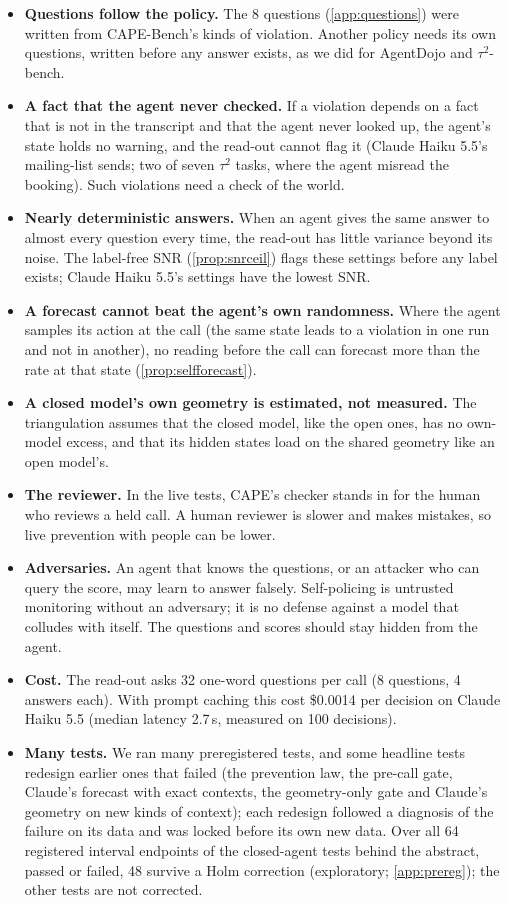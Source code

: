 \begin{itemize}
\item \textbf{Questions follow the policy.} The 8 questions (\cref{app:questions}) were written from CAPE-Bench's kinds of violation. Another policy needs its own questions, written before any answer exists, as we did for AgentDojo and $\tau^2$-bench.
\item \textbf{A fact that the agent never checked.} If a violation depends on a fact that is not in the transcript and that the agent never looked up, the agent's state holds no warning, and the read-out cannot flag it (Claude Haiku 5.5's mailing-list sends; two of seven $\tau^2$ tasks, where the agent misread the booking). Such violations need a check of the world.
\item \textbf{Nearly deterministic answers.} When an agent gives the same answer to almost every question every time, the read-out has little variance beyond its noise. The label-free SNR (\cref{prop:snrceil}) flags these settings before any label exists; Claude Haiku 5.5's settings have the lowest SNR.
\item \textbf{A forecast cannot beat the agent's own randomness.} Where the agent samples its action at the call (the same state leads to a violation in one run and not in another), no reading before the call can forecast more than the rate at that state (\cref{prop:selfforecast}).
\item \textbf{A closed model's own geometry is estimated, not measured.} The triangulation assumes that the closed model, like the open ones, has no own-model excess, and that its hidden states load on the shared geometry like an open model's.
\item \textbf{The reviewer.} In the live tests, CAPE's checker stands in for the human who reviews a held call. A human reviewer is slower and makes mistakes, so live prevention with people can be lower.
\item \textbf{Adversaries.} An agent that knows the questions, or an attacker who can query the score, may learn to answer falsely. Self-policing is untrusted monitoring without an adversary; it is no defense against a model that colludes with itself. The questions and scores should stay hidden from the agent.
\item \textbf{Cost.} The read-out asks 32 one-word questions per call (8 questions, 4 answers each). With prompt caching this cost \$0.0014 per decision on Claude Haiku 5.5 (median latency 2.7\,s, measured on 100 decisions).
\item \textbf{Many tests.} We ran many preregistered tests, and some headline tests redesign earlier ones that failed (the prevention law, the pre-call gate, Claude's forecast with exact contexts, the geometry-only gate and Claude's geometry on new kinds of context); each redesign followed a diagnosis of the failure on its data and was locked before its own new data. Over all 64 registered interval endpoints of the closed-agent tests behind the abstract, passed or failed, 48 survive a Holm correction (exploratory; \cref{app:prereg}); the other tests are not corrected.
\end{itemize}

